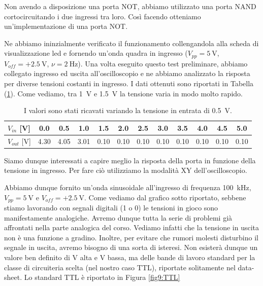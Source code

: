 Non avendo a disposizione una porta NOT, abbiamo utilizzato una porta NAND cortocircuitando i due ingressi tra loro.
Così facendo otteniamo un'implementazione di una porta NOT.

Ne abbiamo ininzialmente verificato il funzionamento collengandola alla scheda di visualizzazione led e fornendo un'onda quadra in ingresso ($V_{pp}=\SI{5}{\volt}$, $V_{off}=+\SI{2.5}{\volt}$, $\nu=\SI{2}{\hertz}$).
Una volta eseguito questo test preliminare, abbiamo collegato ingresso ed uscita all'oscilloscopio e ne abbiamo analizzato la risposta per diverse tensioni costanti in ingresso.
I dati ottenuti sono riportati in Tabella (\ref{tab9:risposta2}).
Come vediamo, tra \SI{1}{\volt} e \SI{1.5}{\volt} la tensione varia in modo molto rapido.

\vspace{2mm}
\begin{table}[htpc]
\centering
{\renewcommand{\arraystretch}{1.1}%
\begin{tabular}{|l|c|c|c|c|c|c|c|c|c|c|c|}
\hline
$V_{in}$ [\si{\volt}] & 0.0 & 0.5 & 1.0 & 1.5 & 2.0 & 2.5 & 3.0 & 3.5 & 4.0 & 4.5 & 5.0 \\
\hline
$V_{out}$ [\si{\volt}] & 4.30 & 4.05 & 3.01 & 0.10 & 0.10 & 0.10 & 0.10 & 0.10 & 0.10 & 0.10 & 0.10 \\
\hline
\end{tabular}}
\caption{I valori sono stati ricavati variando la tensione in entrata di \SI{.5}{\V}.}
\label{tab9:risposta2}
\end{table}

Siamo dunque interessati a capire meglio la risposta della porta in funzione della tensione in ingresso.
Per fare ciò utilizziamo la modalità XY dell'oscilloscopio.

Abbiamo dunque fornito un'onda sinusoidale all'ingresso di frequenza \SI{100}{\kilo\hertz}, $V_{pp}=\SI{5}{\volt}$ e $V_{off}=+\SI{2.5}{\volt}$.
Come vediamo dal grafico sotto riportato, sebbene stiamo lavorando con segnali digitali (1 o 0) le tensioni in gioco sono manifestamente analogiche.
Avremo dunque tutta la serie di problemi già affrontati nella parte analogica del corso.
Vediamo infatti che la tensione in uscita non è una funzione a gradino.
Inoltre, per evitare che rumori molesti disturbino il segnale in uscita, avremo bisogno di una sorta di isteresi.
Non esisterà dunque un valore ben definito di V alta e V bassa, ma delle bande di lavoro standard per la classe di circuiteria scelta (nel nostro caso TTL), riportate solitamente nel data-sheet.
Lo standard TTL è riportato in Figura \ref{fig9:TTL}

